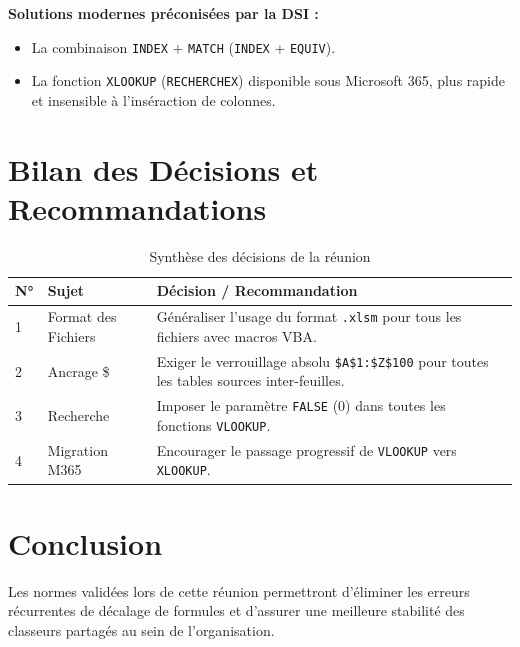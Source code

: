 \documentclass[12pt,a4paper]{article}
\begin{document}
\textbf{Solutions modernes préconisées par la DSI :}
\begin{itemize}
    \item La combinaison \texttt{INDEX} + \texttt{MATCH} (\texttt{INDEX} + \texttt{EQUIV}).
    \item La fonction \texttt{XLOOKUP} (\texttt{RECHERCHEX}) disponible sous Microsoft 365, plus rapide et insensible à l'inséraction de colonnes.
\end{itemize}

\section{Bilan des Décisions et Recommandations}

\begin{table}[h]
\centering
\begin{tabular}{@{}llp{6cm}@{}}
\toprule
\textbf{N°} & \textbf{Sujet} & \textbf{Décision / Recommandation} \\ \midrule
1 & Format des Fichiers & Généraliser l'usage du format \texttt{.xlsm} pour tous les fichiers avec macros VBA. \\
2 & Ancrage \$ & Exiger le verrouillage absolu \texttt{\$A\$1:\$Z\$100} pour toutes les tables sources inter-feuilles. \\
3 & Recherche & Imposer le paramètre \texttt{FALSE} (0) dans toutes les fonctions \texttt{VLOOKUP}. \\
4 & Migration M365 & Encourager le passage progressif de \texttt{VLOOKUP} vers \texttt{XLOOKUP}. \\ \bottomrule
\end{tabular}
\caption{Synthèse des décisions de la réunion}
\end{table}

\section{Conclusion}
Les normes validées lors de cette réunion permettront d'éliminer les erreurs récurrentes de décalage de formules et d'assurer une meilleure stabilité des classeurs partagés au sein de l'organisation.
\end{document}
